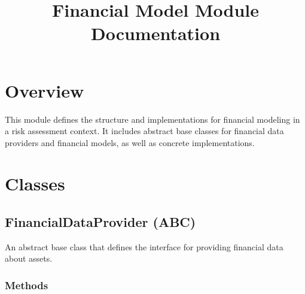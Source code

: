 \documentclass{article}
\title{Financial Model Module Documentation}
\author{}
\date{}
\begin{document}
\maketitle

\section{Overview}

This module defines the structure and implementations for financial modeling in a risk assessment context. It includes abstract base classes for financial data providers and financial models, as well as concrete implementations.

\section{Classes}

\subsection{FinancialDataProvider (ABC)}

An abstract base class that defines the interface for providing financial data about assets.

\subsubsection{Methods}
\end{document}
